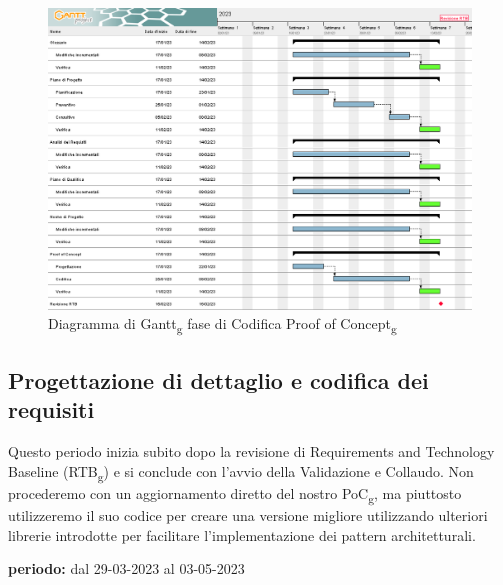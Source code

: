 \begin{figure}[H]
    \centering
    \includegraphics[scale=0.56]{image/gantt_terzo_periodo.png}
    \caption{Diagramma di Gantt\textsubscript{g} fase di Codifica Proof of Concept\textsubscript{g}}
\end{figure}
\pagebreak

\subsection{Progettazione di dettaglio e codifica dei requisiti}
Questo periodo inizia subito dopo la revisione di Requirements and Technology Baseline (RTB\textsubscript{g}) e si conclude con l'avvio della Validazione e Collaudo. Non procederemo con un aggiornamento diretto del nostro PoC\textsubscript{g}, ma piuttosto utilizzeremo il suo codice per creare una versione migliore utilizzando ulteriori librerie introdotte per facilitare l’implementazione dei pattern architetturali.
\begin{center}
\textbf{periodo:} dal 29-03-2023 al 03-05-2023\\
\end{center}
